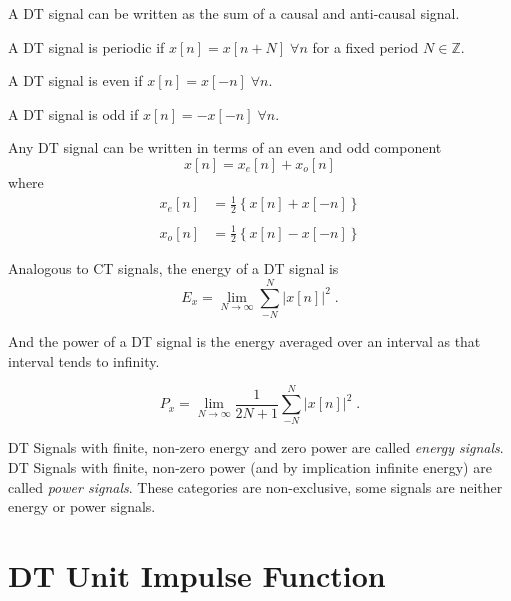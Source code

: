 A DT signal can be written as the sum of a causal and anti-causal signal.

A DT signal is periodic if $x[n] = x[n + N] \; \forall n$ for a fixed period $N \in \mathbb{Z}$.

A DT signal is even if $x[n] = x[-n] \; \forall n$. 

A DT signal is odd if $x[n] = -x[-n] \; \forall n$.

Any DT signal can be written in terms of an even and odd component
\[
x[n] = x_e[n] + x_o[n] 
\]
where 
\[
\begin{array}{ll}
x_e[n] &= \frac{1}{2}\left\{x[n] + x[-n]\right\} \\
& \\
x_o[n] &= \frac{1}{2}\left\{x[n] - x[-n]\right\}
\end{array}
\]

Analogous to CT signals, the energy of a DT signal is
\[
E_x = \lim_{N\rightarrow\infty} \sum\limits_{-N}^N \lvert x[n]\rvert^2 \; .
\]

And the power of a DT signal is the energy averaged over an interval as that interval tends to infinity.

\[
P_x = \lim_{N\rightarrow\infty} \frac{1}{2N+1} \sum\limits_{-N}^N \lvert x[n]\rvert^2 \; .
\]

DT Signals with finite, non-zero energy and zero power are called {\it energy signals}. DT Signals with finite, non-zero power (and by implication infinite energy) are called {\it power signals}. These categories are non-exclusive, some signals are neither energy or power signals.

\section{DT Unit Impulse Function}

